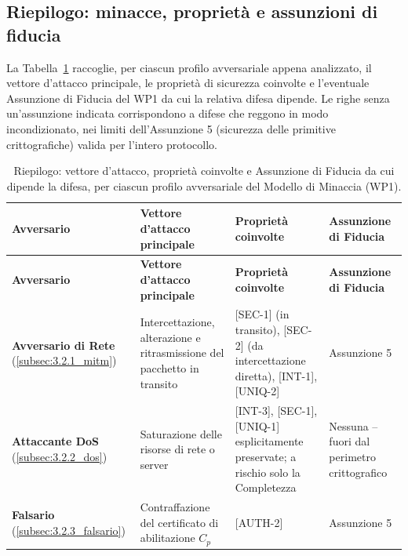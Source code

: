 \subsection{Riepilogo: minacce, proprietà e assunzioni di fiducia}
\label{subsec:3.2.8_riepilogo_minacce}

La Tabella~\ref{tab:riepilogo_minacce_assunzioni} raccoglie, per ciascun profilo avversariale appena analizzato, il vettore d'attacco principale, le proprietà di sicurezza coinvolte e l'eventuale Assunzione di Fiducia del WP1 da cui la relativa difesa dipende. Le righe senza un'assunzione indicata corrispondono a difese che reggono in modo incondizionato, nei limiti dell'Assunzione 5 (sicurezza delle primitive crittografiche) valida per l'intero protocollo.

\begin{longtable}{| p{2.1cm} | p{4.0cm} | p{2.8cm} | p{3.2cm} |}
    \caption{Riepilogo: vettore d'attacco, proprietà coinvolte e Assunzione di Fiducia da cui dipende la difesa, per ciascun profilo avversariale del Modello di Minaccia (WP1).}
    \label{tab:riepilogo_minacce_assunzioni} \\

    \hline
    \textbf{Avversario}
    & \textbf{Vettore d'attacco principale}
    & \textbf{Proprietà coinvolte}
    & \textbf{Assunzione di Fiducia} \\
    \hline
    \hline
    \endfirsthead

    \hline
    \textbf{Avversario}
    & \textbf{Vettore d'attacco principale}
    & \textbf{Proprietà coinvolte}
    & \textbf{Assunzione di Fiducia} \\
    \hline
    \hline
    \endhead

    \textbf{Avversario di Rete} \newline (\ref{subsec:3.2.1_mitm})
    & Intercettazione, alterazione e ritrasmissione del pacchetto in transito
    & [SEC-1] (in transito), [SEC-2] (da intercettazione diretta), [INT-1], [UNIQ-2]
    & Assunzione 5 \\
    \hline

    \textbf{Attaccante DoS} \newline (\ref{subsec:3.2.2_dos})
    & Saturazione delle risorse di rete o server
    & [INT-3], [SEC-1], [UNIQ-1] esplicitamente preservate; a rischio solo la Completezza
    & Nessuna -- fuori dal perimetro crittografico \\
    \hline

    \textbf{Falsario} \newline (\ref{subsec:3.2.3_falsario})
    & Contraffazione del certificato di abilitazione $C_p$
    & [AUTH-2]
    & Assunzione 5 \\
    \hline


\end{longtable}
